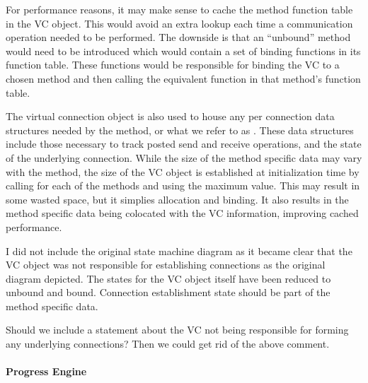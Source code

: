 \begin{implnote}
  For performance reasons, it may make sense to cache the method function table
  in the VC object.  This would avoid an extra lookup each time a communication
  operation needed to be performed.  The downside is that an ``unbound'' method
  would need to be introduced which would contain a set of binding functions in
  its function table.  These functions would be responsible for binding the VC
  to a chosen method and then calling the equivalent function in that method's
  function table.
\end{implnote}

The virtual connection object is also used to house any per connection data
structures needed by the method, or what we refer to as .  These data structures include those necessary to track posted send
and receive operations, and the state of the underlying connection.  While the
size of the method specific data may vary with the method, the size of the VC
object is established at initialization time by calling
 for each of the methods and using the maximum
value.  This may result in some wasted space, but it simplies allocation and
binding.  It also results in the method specific data being colocated with the
VC information, improving cached performance.

\begin{cmt}[BRT]
  I did not include the original state machine diagram as it became clear that
  the VC object was not responsible for establishing connections as the
  original diagram depicted.  The states for the VC object itself have been
  reduced to unbound and bound.  Connection establishment state should be part
  of the method specific data.
\end{cmt}

\Q Should we include a statement about the VC not being responsible for forming
any underlying connections?  Then we could get rid of the above comment.


\paragraph{Progress Engine}


